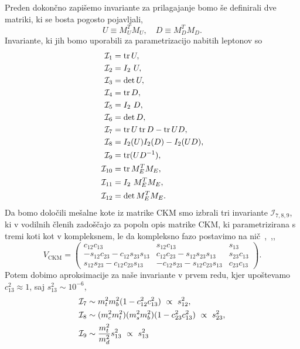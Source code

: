 \noindent Preden dokončno zapišemo invariante za prilagajanje bomo še definirali dve matriki,
ki se bosta pogosto pojavljali,
\begin{equation}
	U \equiv M_U^T M_U, \quad D \equiv M_D^T M_D.
\end{equation}
Invariante, ki jih bomo uporabili za parametrizacijo nabitih leptonov so
\begin{align}
	\mathcal{I}_1 &= \operatorname{tr} U, \notag \\
	\mathcal{I}_2 &= I_2\ U, \notag \\
	\mathcal{I}_3 &= \det U, \notag \\
	\mathcal{I}_4 &= \operatorname{tr} D, \notag \\
	\mathcal{I}_5 &= I_2\ D, \notag \\
	\mathcal{I}_6 &= \det D, \notag \\
	\mathcal{I}_7 &= \operatorname{tr} U\operatorname{tr} D - \operatorname{tr} UD, \notag \\
	\mathcal{I}_8 &= I_2(U)I_2(D) - I_2 (UD), \notag \\
	\mathcal{I}_9 &= \operatorname{tr} (UD^{-1}), \notag \\
	\mathcal{I}_{10} &= \operatorname{tr} M_E^T M_E, \notag \\
	\mathcal{I}_{11} &= I_2\ M_E^T M_E, \notag \\
	\mathcal{I}_{12} &= \det M_E^T M_E.
\end{align}
Da bomo določili mešalne kote iz matrike CKM smo izbrali tri invariante $\mathcal{I}_{7,8,9}$, ki v
vodilnih členih zadoščajo za popoln opis matrike CKM, ki parametrizirana s tremi koti kot v
kompleksnem, le da kompleksno fazo postavimo na nič~\cite{pdg:ckm},~\cite{pdg:neutrinos},\cite{miha},
\begin{equation}
	V_\text{CKM} = \begin{pmatrix}
		c_{12} c_{13} & s_{12} c_{13} & s_{13} \\
		-s_{12}c_{23} - c_{12}s_{23}s_{13} & c_{12}c_{23} - s_{12}s_{23}s_{13} & s_{23}c_{13} \\
		s_{12}s_{23} - c_{12}c_{23}s_{13} & -c_{12}s_{23} - s_{12}c_{23}s_{13} & c_{23}c_{13}
	\end{pmatrix}.
\end{equation}
Potem dobimo aproksimacije za naše invariante v prvem redu, kjer upoštevamo $c_{13}^2 \approx 1$,
saj $s_{13}^2 \sim 10^{-6}$,
\begin{align}
	\mathcal{I}_7 &\sim m_t^2m_b^2(1 - c_{12}^2c_{13}^2)\ \propto\ s_{12}^2, \notag \\
	\mathcal{I}_8 &\sim (m_c^2m_t^2)(m_s^2m_b^2)(1 - c_{23}^2c_{13}^2)\ \propto\ s_{23}^2, \notag \\
	\mathcal{I}_9 &\sim \frac{m_t^2}{m_d^2} s_{13}^2\ \propto\ s_{13}^2
\end{align}
